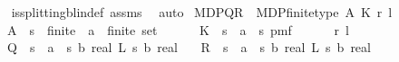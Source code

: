 \begin{isabellebody}
%
\isadelimproof
\ \ %
\endisadelimproof
%
\isatagproof
{}\isamarkupfalse%
\ is{\isacharunderscore}{\kern0pt}splitting{\isacharunderscore}{\kern0pt}blin{\isacharunderscore}{\kern0pt}def{\isacharprime}{\kern0pt}\ assms\ \isamarkupfalse%
\ auto%
\endisatagproof
{\isafoldproof}%
%
\isadelimproof
%
\endisadelimproof
%
\isadelimdocument
%
\endisadelimdocument
%
\isatagdocument
%
\isamarkuptrue%
%
\endisatagdocument
{\isafolddocument}%
%
\isadelimdocument
%
\endisadelimdocument
{}\isamarkupfalse%
\ MDP{\isacharunderscore}{\kern0pt}QR\ {\isacharequal}{\kern0pt}\ MDP{\isacharunderscore}{\kern0pt}finite{\isacharunderscore}{\kern0pt}type\ A\ K\ r\ l\ \isanewline
\ \ \ A\ {\isacharcolon}{\kern0pt}{\isacharcolon}{\kern0pt}\ {\isachardoublequoteopen}{\isacharprime}{\kern0pt}s\ {\isacharcolon}{\kern0pt}{\isacharcolon}{\kern0pt}\ finite\ {\isasymRightarrow}\ {\isacharparenleft}{\kern0pt}{\isacharprime}{\kern0pt}a\ {\isacharcolon}{\kern0pt}{\isacharcolon}{\kern0pt}\ finite{\isacharparenright}{\kern0pt}\ set{\isachardoublequoteclose}\ \isanewline
\ \ \ \ \ K\ {\isacharcolon}{\kern0pt}{\isacharcolon}{\kern0pt}\ {\isachardoublequoteopen}{\isacharparenleft}{\kern0pt}{\isacharprime}{\kern0pt}s\ {\isasymtimes}\ {\isacharprime}{\kern0pt}a{\isacharparenright}{\kern0pt}\ {\isasymRightarrow}\ {\isacharprime}{\kern0pt}s\ pmf{\isachardoublequoteclose}\isanewline
\ \ \ \ \ \ r\ l\ {\isacharplus}{\kern0pt}\isanewline
\ \ \ Q\ {\isacharcolon}{\kern0pt}{\isacharcolon}{\kern0pt}\ {\isachardoublequoteopen}{\isacharparenleft}{\kern0pt}{\isacharprime}{\kern0pt}s\ {\isasymRightarrow}\ {\isacharprime}{\kern0pt}a{\isacharparenright}{\kern0pt}\ {\isasymRightarrow}\ {\isacharparenleft}{\kern0pt}{\isacharprime}{\kern0pt}s\ {\isasymRightarrow}\isactrlsub b\ real{\isacharparenright}{\kern0pt}\ {\isasymRightarrow}\isactrlsub L\ {\isacharparenleft}{\kern0pt}{\isacharprime}{\kern0pt}s\ {\isasymRightarrow}\isactrlsub b\ real{\isacharparenright}{\kern0pt}{\isachardoublequoteclose}\isanewline
\ \ \ R\ {\isacharcolon}{\kern0pt}{\isacharcolon}{\kern0pt}\ {\isachardoublequoteopen}{\isacharparenleft}{\kern0pt}{\isacharprime}{\kern0pt}s\ {\isasymRightarrow}\ {\isacharprime}{\kern0pt}a{\isacharparenright}{\kern0pt}\ {\isasymRightarrow}\ {\isacharparenleft}{\kern0pt}{\isacharprime}{\kern0pt}s\ {\isasymRightarrow}\isactrlsub b\ real{\isacharparenright}{\kern0pt}\ {\isasymRightarrow}\isactrlsub L\ {\isacharparenleft}{\kern0pt}{\isacharprime}{\kern0pt}s\ {\isasymRightarrow}\isactrlsub b\ real{\isacharparenright}{\kern0pt}{\isachardoublequoteclose}\isanewline

\end{isabellebody}
